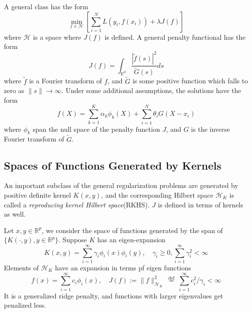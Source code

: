 A general class has the form
\begin{equation*}
    \min _{f \in \mathcal{H}}\left[\sum_{i=1}^{N} L\left(y_{i}, f\left(x_{i}\right)\right)
    +\lambda J(f)\right]
\end{equation*}
where $\mathcal{H}$ is a space where $J(f)$ is defined. A general penalty functional has the 
form
\begin{equation*}
    J(f)=\int_{\mathbb{R}^{d}} \frac{|\tilde{f}(s)|^{2}}{\tilde{G}(s)} d s
\end{equation*}
where $\tilde{f}$ is a Fourier transform of $f$, and $\tilde{G}$ is some positive function
which falls to zero as $\|s\|\rightarrow\infty$. Under some additional assumptions, the
solutions have the form
\begin{equation*}
    f(X)=\sum_{k=1}^{K} \alpha_{k} \phi_{k}(X)+\sum_{i=1}^{N} \theta_{i} G\left(X-x_{i}\right)
\end{equation*}
where $\phi_k$ span the null space of the penalty function $J$, and $G$ is the inverse Fourier
transform of $\tilde{G}$. 

\subsection{Spaces of Functions Generated by Kernels}
An important subclass of the general regularization problems are generated by positive
definite kernel $K(x,y)$, and the corresponding Hilbert space $\mathcal{H}_K$ is called a \textit{reproducing
kernel Hilbert space}(RKHS). $J$ is defined in terms of kernels as well. 

Let $x,y\in\mathbb{R}^p$, we consider the space of functions generated by the span of 
$\{K(\cdot,y),y\in\mathbb{R}^p\}$. Suppose $K$ has an eigen-expansion
\begin{equation*}
    K(x, y)=\sum_{i=1}^{\infty} \gamma_{i} \phi_{i}(x) \phi_{i}(y),\quad
    \gamma_{i} \geq 0, \sum_{i=1}^{\infty} \gamma_{i}^{2}<\infty
\end{equation*}
Elements of $\mathcal{H}_K$ have an expansion in terms pf eigen functions
\begin{equation*}
f(x)=\sum_{i=1}^{\infty} c_{i} \phi_{i}(x), \quad 
J(f):=\|f\|_{\mathcal{H}_{K}}^{2} \stackrel{\text { def }}{=} \sum_{i=1}^{\infty} c_{i}^{2} 
/ \gamma_{i}<\infty
\end{equation*}
It is a generalized ridge penalty, and functions with larger eigenvalues get penalized less. 

